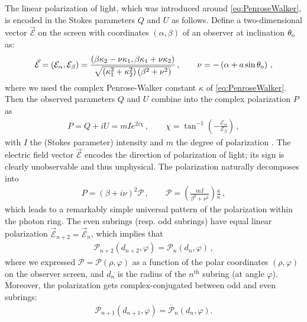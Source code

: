 \documentclass[graybox,envcountchap]{svmult}
\newcommand{\pa}[1]{\left(#1\right)}
\begin{document}
The linear polarization of light, which was introduced around \eqref{eq:PenroseWalker}, is encoded in the Stokes parameters $Q$ and $U$ as follows.
Define a two-dimensional vector $\vec{\mathcal{E}}$ on the screen with coordinates $(\alpha,\beta)$ of an observer at inclination $\theta_{\rm o}$ as:
\begin{align}
    \vec{\mathcal{E}}=\pa{\mathcal{E}_\alpha,\mathcal{E}_\beta}
    =\frac{\pa{\beta\kappa_2-\nu\kappa_1,\beta\kappa_1+\nu\kappa_2}}{\sqrt{\pa{\kappa_1^2+\kappa_2^2}\pa{\beta^2+\nu^2}}}\,,\qquad
    \nu=-\pa{\alpha+a\sin\theta_{\rm o}}\,,
\end{align}
where we used the complex Penrose-Walker constant $\kappa$ of \eqref{eq:PenroseWalker}.
Then the observed parameters $Q$ and $U$ combine into the complex polarization $P$ as
\begin{align}
    P=Q+iU=mIe^{2i\chi}\,,\qquad
    \chi=\tan^{-1}\pa{-\frac{\mathcal{E}_\alpha}{\mathcal{E}_\beta}}\,,
\end{align}
with $I$ the (Stokes parameter) intensity and $m$ the degree of polarization \cite{Himwich2020}.
The electric field vector $\vec{\mathcal{E}}$ encodes the direction of polarization of light; its sign is clearly unobservable and thus unphysical.
The polarization naturally decomposes into \cite{Himwich2020}
\begin{align}
    P=(\beta+i\nu)^2\mathcal{P}\,,\qquad 
    \mathcal{P}=\pa{\frac{mI}{\beta^2+\nu^2}}\frac{\overline\kappa}{\kappa}\,,
\end{align}
which leads to a remarkably simple universal pattern of the polarization within the photon ring.
The even subrings (resp. odd subrings) have equal linear polarization $\vec{\mathcal{E}}_{n+2}=\vec{\mathcal{E}}_n$, which implies that
\begin{align}
    \label{eq:EvenEvenPolarization}
    \mathcal{P}_{n+2}(d_{n+2},\varphi)=\mathcal{P}_n(d_n,\varphi)\,,
\end{align} 
where we expressed $\mathcal{P}=\mathcal{P}(\rho,\varphi)$ as a function of the polar coordinates $(\rho,\varphi)$ on the observer screen, and $d_n$ is the radius of the $n^\text{th}$ subring (at angle $\varphi$).
Moreover, the polarization gets complex-conjugated between odd and even subrings:
\begin{align}
    \label{eq:EvenOddPolarization}
    \mathcal{P}_{n+1}(d_{n+1},\varphi)=\overline{\mathcal{P}}_n(d_n,\varphi).
\end{align}
\end{document}
